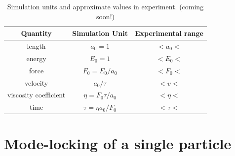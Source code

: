 \documentclass[twocolumn,preprintnumbers,amsmath,amssymb,aps,prx]{revtex4}
\begin{document}
\begin{table}[h!]
\centering
\caption{Simulation units and approximate values
  in experiment. (coming soon!)}
\begin{ruledtabular}
\begin{tabular}{c c c } %
Quantity & Simulation Unit & Experimental range\\
\hline
length &  $a_0 = 1$ & $ < a_0 <$\\
energy & $E_0 = 1$ & $ < E_0 <$ \\
force & $F_0 = E_0 / a_0$ & $<F_0<$\\
velocity &  $ a_0 / \tau $ &  $ < v < $\\
viscosity coefficient & $\eta = F_0 \tau / a_0 $ & $ <\eta<$\\
time &  $ \tau = \eta a_0 / F_0 $ & $ < \tau <$\\

\end{tabular}
\end{ruledtabular}
\label{tab:1}
\end{table}

%
\section{Mode-locking of a single particle}
\label{sec:one}
\end{document}

